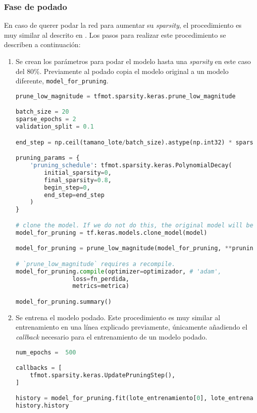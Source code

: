 \subsubsection{Fase de podado}
\label{sssec:modelo_pruebas_fase_podado}
En caso de querer podar la red para aumentar su \textit{sparsity}, el procedimiento es muy similar al descrito en \cite{tensorflow_prune_model}. Los pasos para realizar este procedimiento se describen a continuación:
\begin{enumerate}
    \item Se crean los parámetros para podar el modelo hasta una \textit{sparsity} en este caso del 80\%. Previamente al podado copia el modelo original a un modelo diferente, \texttt{model\_for\_pruning}.\medskip
\begin{lstlisting}[language=Python]
prune_low_magnitude = tfmot.sparsity.keras.prune_low_magnitude

batch_size = 20
sparse_epochs = 2
validation_split = 0.1

end_step = np.ceil(tamano_lote/batch_size).astype(np.int32) * sparse_epochs

pruning_params = {
    'pruning_schedule': tfmot.sparsity.keras.PolynomialDecay(
        initial_sparsity=0,                                                    
        final_sparsity=0.8,
        begin_step=0,
        end_step=end_step
    )
}

# clone the model. If we do not do this, the original model will be altered too
model_for_pruning = tf.keras.models.clone_model(model)

model_for_pruning = prune_low_magnitude(model_for_pruning, **pruning_params)

# `prune_low_magnitude` requires a recompile.
model_for_pruning.compile(optimizer=optimizador, # 'adam',
                loss=fn_perdida,
                metrics=metrica)

model_for_pruning.summary()
\end{lstlisting}
    \item Se entrena el modelo podado. Este procedimiento es muy similar al entrenamiento en una línea explicado previamente, únicamente añadiendo el \textit{callback} necesario para el entrenamiento de un modelo podado.
\begin{lstlisting}[language=Python]
num_epochs =  500

callbacks = [
    tfmot.sparsity.keras.UpdatePruningStep(),
]

history = model_for_pruning.fit(lote_entrenamiento[0], lote_entrenamiento[1], batch_size=batch_size, epochs=num_epochs, validation_split=validation_split, callbacks=callbacks)
history.history
\end{lstlisting}
\end{enumerate}

